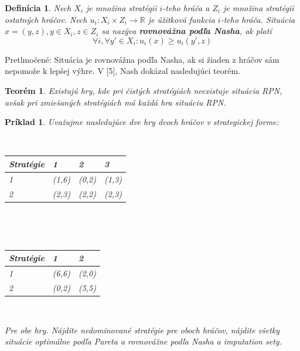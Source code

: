 \documentclass[a5paper,12pt]{article}
\newtheorem*{thm}{Teor\'em}
\newtheorem*{mydef}{Defin\'icia}
\newtheorem*{exampl}{Pr\'iklad}
\begin{document}
      \begin{mydef}
      Nech $X_{i}$ je mno\v{z}ina strat\'egii $i$-teho hr\'a\v{c}a a $Z_{i}$ je mno\v{z}ina strat\'egii ostatn\'ych hr\'a\v{c}ov. Nech $u_{i}: X_{i} \times Z_{i} \to \mathbb{R}$ je \'u\v{z}itkov\'a funkcia $i$-teho hr\'a\v{c}a. Situ\'acia $x=(y,z), y\in X_{i}, z\in Z_{i}$ sa naz\'yva {\bf rovnov\'a\v{z}na pod\v{l}a Nasha}, ak plat\'i
      \[\forall i, \forall y' \in X_{i}: u_{i}(x) \geq u_{i}(y',z)\]
      \end{mydef}

      Pretlmo\v{c}en\'e: Situ\'acia je rovnov\'a\v{z}na pod\v{l}a Nasha, ak si \v{z}iaden z hr\'a\v{c}ov s\'am nepomo\v{z}e k lep\v{s}ej v\'yhre. V [5], Nash dok\'azal nasleduj\'uci teor\'em.

      \begin{thm}
      Existuj\'u hry, kde pri \v{c}ist\'ych strat\'egi\'ach neexistuje situ\'acia RPN, av\v{s}ak pri zmie\v{s}an\'ych strat\'egi\'ach m\'a ka\v{z}d\'a hra situ\'aciu RPN.
      \end{thm}
      
      \begin{exampl} Uva\v{z}ujme nasleduj\'uce dve hry dvoch hr\'a\v{c}ov v strategickej forme:

      \

      \begin{tabular}{ l l l l}
      Strat\'egie            & 1 & 2 & 3 \\
      \hline
       1  & (1,6) & (0,2) & (1,3) \\
       2  & (2,3) & (2,2) & (2,3) \\
      \end{tabular}

      \

      \

      \begin{tabular}{l l l}
      Strat\'egie            & 1 & 2 \\
      \hline
       1  & (6,6) & (2,0) \\
       2  & (0,2) & (5,5) \\
      \end{tabular}

      \

      Pre obe hry. N\'ajdite nedominovan\'e strat\'egie pre oboch hr\'a\v{c}ov, n\'ajdite v\v{s}etky situ\'acie optim\'alne pod\v{l}a Pareta a rovnov\'a\v{z}ne pod\v{l}a Nasha a imputation sety.

      \end{exampl}
\end{document}
